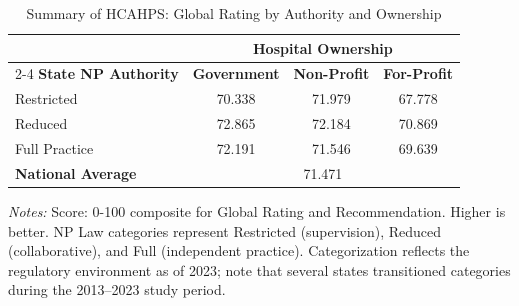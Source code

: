 \begin{table}[htbp]
    \centering
    \caption{Summary of HCAHPS: Global Rating by Authority and Ownership}
    \label{tab:hcahps_grp4}
    \vspace{0.2cm}
    \begin{tabular}{lccc}
        \toprule
        & \multicolumn{3}{c}{\textbf{Hospital Ownership}} \\
        \cmidrule(lr){2-4}
        \textbf{State NP Authority} & \textbf{Government} & \textbf{Non-Profit} & \textbf{For-Profit} \\
        \midrule
        Restricted & 70.338 & 71.979 & 67.778 \\
        Reduced & 72.865 & 72.184 & 70.869 \\
        Full Practice & 72.191 & 71.546 & 69.639 \\
        \midrule
        \textbf{National Average} & \multicolumn{3}{c}{71.471} \\
        \bottomrule
    \end{tabular}
    \vspace{0.1cm}
    \begin{minipage}{0.85\textwidth}
        \footnotesize \textit{Notes:} Score: 0-100 composite for Global Rating and Recommendation. Higher is better. NP Law categories represent Restricted (supervision), Reduced (collaborative), and Full (independent practice). Categorization reflects the regulatory environment as of 2023; note that several states transitioned categories during the 2013--2023 study period.
    \end{minipage}
\end{table}